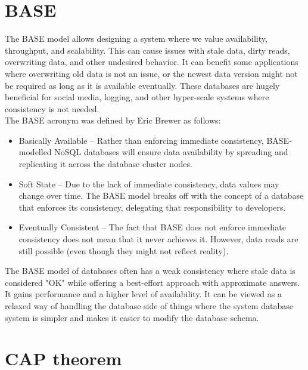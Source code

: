 \documentclass[a4paper,10pt,titlepage]{report}
\begin{document}
    \section{BASE}
    The BASE model allows designing a system where we value availability, throughput, and scalability. This can cause issues with stale data, dirty reads, overwriting data, and other undesired behavior. It can benefit some applications where overwriting old data is not an issue, or the newest data version might not be required as long as it is available eventually. These databases are hugely beneficial for social media, logging, and other hyper-scale systems where consistency is not needed.\\
    \vspace{5mm}
    The BASE acronym was defined by Eric Brewer\cite{brewer2000towards} as follows:

    \begin{itemize}
        \item Basically Available – Rather than enforcing immediate consistency, BASE-modelled NoSQL databases will ensure data availability by spreading and replicating it across the database cluster nodes.
        \item Soft State – Due to the lack of immediate consistency, data values may change over time. The BASE model breaks off with the concept of a database that enforces its consistency, delegating that responsibility to developers.
        \item Eventually Consistent – The fact that BASE does not enforce immediate consistency does not mean that it never achieves it. However, data reads are still possible (even though they might not reflect reality).
    \end{itemize}

    The BASE model of databases often has a weak consistency where stale data is considered "OK" while offering a best-effort approach with approximate answers. It gains performance and a higher level of availability. It can be viewed as a relaxed way of handling the database side of things where the system database system is simpler and makes it easier to modify the database schema.

    \section{CAP theorem}
\end{document}

